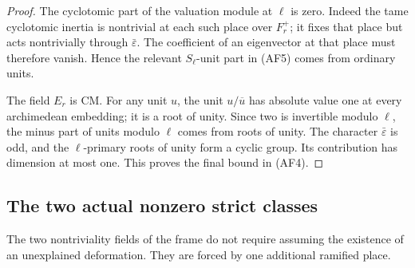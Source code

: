 \begin{proof}
The cyclotomic part of the valuation module at
\(\ell\) is zero.
Indeed the tame cyclotomic inertia is nontrivial at
each such place over \(F_r^+\); it fixes that place
but acts nontrivially through \(\bar\varepsilon\).
The coefficient of an eigenvector at that place must
therefore vanish.
Hence the relevant \(S_\ell\)-unit part in (AF5)
comes from ordinary units.

The field \(E_r\) is CM.
For any unit \(u\), the unit \(u/\overline u\) has
absolute value one at every archimedean embedding;
it is a root of unity.
Since two is invertible modulo \(\ell\), the
minus part of units modulo \(\ell\) comes from
roots of unity.
The character \(\bar\varepsilon\) is odd, and the
\(\ell\)-primary roots of unity form a cyclic group.
Its contribution has dimension at most one.
This proves the final bound in (AF4).
\end{proof}

\subsection{The two actual nonzero strict classes}
The two nontriviality fields of the frame do not require
assuming the existence of an unexplained deformation.
They are forced by one additional ramified place.

